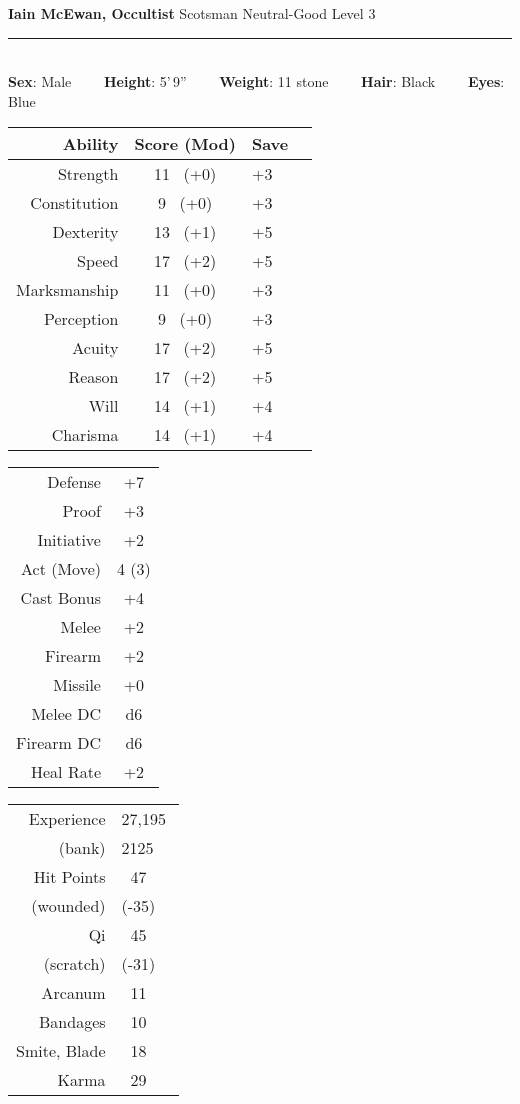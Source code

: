 \documentclass[11pt]{article}
\newcommand{\heading}[1]{{\sc\bfseries #1}}
\begin{document}
\pagestyle{empty}
\noindent
{\huge\bfseries Iain McEwan, Occultist}
\hfill
{\Large Scotsman}
\hfill
{\Large Neutral-Good}
\hfill
{\Large Level 3}
\\[-8pt]
\hrule

\mbox{ }
\\[6pt]
\heading{Sex}: Male
\ \ \ \
\heading{Height}: 5'\,9''
\ \ \ \
\heading{Weight}: 11 stone
\ \ \ \
\heading{Hair}: Black
\ \ \ \
\heading{Eyes}: Blue

\noindent
\begin{tabular}[t]{|r|c|l|c|}
\hline
\heading{Ability}
& \heading{Score (Mod)}
& \heading{Save}
\\ \hline \hline
\sc Strength & 11 \ (+0)
& +3
\\
\sc Constitution & 9 \ (+0)
& +3
\\ \hline
\sc Dexterity & 13 \ (+1)
& +5
\\
\sc Speed & 17 \ (+2)
& +5
\\ \hline
\sc Marksmanship & 11 \ (+0)
& +3
\\
\sc Perception & 9 \ (+0)
& +3
\\
\sc Acuity & 17 \ (+2)
& +5
\\ \hline
\sc Reason & 17 \ (+2)
& +5
\\
\sc Will & 14 \ (+1)
& +4
\\
\sc Charisma & 14 \ (+1)
& +4
\\ \hline
\end{tabular}
\hfill
\begin{tabular}[t]{|r|c|}
\hline
\sc Defense & +7
\\
\sc Proof & +3
\\ \hline
\sc Initiative & +2
\\
\sc Act (Move) & 4 (3)
\\  \hline
\sc Cast Bonus & +4
\\ \hline
\sc Melee & +2
\\
\sc Firearm & +2
\\
\sc Missile & +0
\\ \hline
\sc Melee DC & d6
\\
\sc Firearm DC & d6
\\ \hline
\sc Heal Rate & +2
\\ \hline
\end{tabular}
%
\hfill
%
\begin{tabular}[t]{|r|c|c|}
\hline
\sc Experience & \multicolumn{2}{|l|}{27,195}
\\
(bank) & \multicolumn{2}{|l|}{2125}
\\ \hline
\sc Hit Points & 47 & \hspace*{10em}
\\
(wounded) & (-35) &
\\[6pt] \hline
\sc Qi &  45 &
\\ (scratch) & (-31) &
\\[2pt] \hline
\sc Arcanum & 11 &
\\[2pt] \hline
\sc Bandages & 10 &
\\[2pt] \hline
\sc Smite, Blade & 18 &
\\[2pt] \hline
\sc Karma & 29 &
\\ \hline
\end{tabular}
\end{document}
